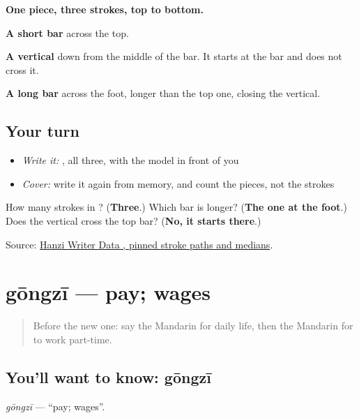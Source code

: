 \begin{quote}
\end{quote}

\textbf{One piece, three strokes, top to bottom.}

\textbf{A short bar} across the top.

\textbf{A vertical} down from the middle of the bar. It starts at the bar and does not cross it.

\textbf{A long bar} across the foot, longer than the top one, closing the vertical.

\subsection*{Your turn}
\begin{itemize}
\raggedright
  \item \emph{Write it:} , all three, with the model in front of you
  \item \emph{Cover:} write it again from memory, and count the pieces, not the strokes
\end{itemize}

\begin{tcolorbox}[breakable,colback=teal!4,colframe=teal!35!black,title={Before you move on}]
How many strokes in ? (\textbf{Three}.) Which bar is longer? (\textbf{The one at the foot}.) Does the vertical cross the top bar? (\textbf{No, it starts there}.)

Source: \href{https://raw.githubusercontent.com/chanind/hanzi-writer-data/68d10a4b21150cae5e1ebbd223eed289cf32d90c/data/\%E5\%B7\%A5.json}{Hanzi Writer Data , pinned stroke paths and medians}.
\end{tcolorbox}
\section[gōngzī]{gōngzī — pay; wages}

\label{lesson:ZH-C255-gongzi}



\begin{quote}
Before the new one: say the Mandarin for daily life, then the Mandarin for to work part-time.
\end{quote}

\subsection*{You'll want to know: gōngzī}
\emph{gōngzī} — \textquotedblleft{}pay; wages\textquotedblright{}.

